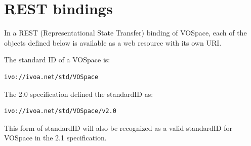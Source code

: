 \documentclass[11pt,a4paper]{ivoa}
\begin{document}
% 
% 
% 
% 

\section{REST bindings}
\label{sec:rest bindings}
In a REST (Representational State Transfer) binding of VOSpace, each of the objects defined below is available as a web resource with its own URI.

The standard ID of a VOSpace is:

\begin{verbatim}ivo://ivoa.net/std/VOSpace\end{verbatim}

The 2.0 specification defined the standardID as:

\begin{verbatim}ivo://ivoa.net/std/VOSpace/v2.0\end{verbatim}

This form of standardID will also be recognized as a valid standardID for VOSpace in the 2.1 specification.
\end{document}
